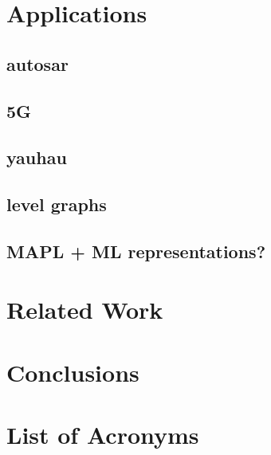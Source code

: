\documentclass{report}
\begin{document}
\chapter{Applications}

\section{autosar}

\section{5G}

\section{yauhau}

\section{level graphs}

\section{MAPL + ML representations?}


\chapter{Related Work}


\chapter{Conclusions} 





\chapter*{List of Acronyms}
\begin{acronym}

\end{acronym}
\clearpage

\listoffigures

\printindex
\end{document}
